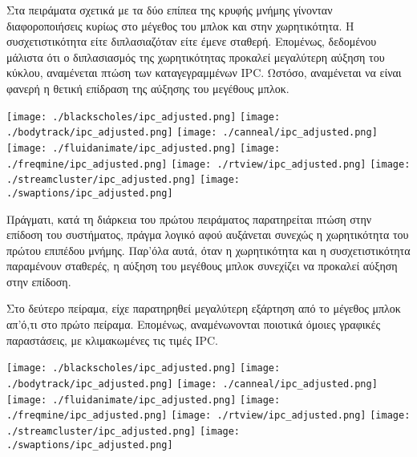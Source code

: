 \documentclass{article}
\newcommand{\eng}[1]{\foreignlanguage{english}{#1}}
\begin{document}
Στα πειράματα σχετικά με τα δύο επίπεα της κρυφής μνήμης γίνονταν διαφοροποιήσεις κυρίως στο μέγεθος του μπλοκ και στην χωρητικότητα. Η συσχετιστικότητα είτε διπλασιαζόταν είτε έμενε σταθερή. Επομένως, δεδομένου μάλιστα ότι ο διπλασιασμός της χωρητικότητας προκαλεί μεγαλύτερη αύξηση του κύκλου, αναμένεται πτώση των καταγεγραμμένων \eng{IPC}. Ωστόσο, αναμένεται να είναι φανερή η θετική επίδραση της αύξησης του μεγέθους μπλοκ.

\graphicspath{{../parsec-3.0/parsec_workspace/outputs/exp1/}}
\begin{center}
    \texttt{[image: ./blackscholes/ipc\_adjusted.png]} 
    \texttt{[image: ./bodytrack/ipc\_adjusted.png]} 
    \texttt{[image: ./canneal/ipc\_adjusted.png]} 
    \texttt{[image: ./fluidanimate/ipc\_adjusted.png]} 
    \texttt{[image: ./freqmine/ipc\_adjusted.png]} 
    \texttt{[image: ./rtview/ipc\_adjusted.png]} 
    \texttt{[image: ./streamcluster/ipc\_adjusted.png]} 
    \texttt{[image: ./swaptions/ipc\_adjusted.png]} 
\end{center}
\FloatBarrier

Πράγματι, κατά τη διάρκεια του πρώτου πειράματος παρατηρείται πτώση στην επίδοση του συστήματος, πράγμα λογικό αφού αυξάνεται συνεχώς η χωρητικότητα του πρώτου επιπέδου μνήμης. Παρ'όλα αυτά, όταν η χωρητικότητα και η συσχετιστικότητα παραμένουν σταθερές, η αύξηση του μεγέθους μπλοκ συνεχίζει να προκαλεί αύξηση στην επίδοση. 

Στο δεύτερο πείραμα, είχε παρατηρηθεί μεγαλύτερη εξάρτηση από το μέγεθος μπλοκ απ'ό,τι στο πρώτο πείραμα. Επομένως, αναμένωνονται ποιοτικά όμοιες γραφικές παραστάσεις, με κλιμακωμένες τις τιμές \eng{IPC}. 

\graphicspath{{../parsec-3.0/parsec_workspace/outputs/exp2/}}
\begin{center}
    \texttt{[image: ./blackscholes/ipc\_adjusted.png]} 
    \texttt{[image: ./bodytrack/ipc\_adjusted.png]} 
    \texttt{[image: ./canneal/ipc\_adjusted.png]} 
    \texttt{[image: ./fluidanimate/ipc\_adjusted.png]} 
    \texttt{[image: ./freqmine/ipc\_adjusted.png]} 
    \texttt{[image: ./rtview/ipc\_adjusted.png]} 
    \texttt{[image: ./streamcluster/ipc\_adjusted.png]} 
    \texttt{[image: ./swaptions/ipc\_adjusted.png]} 
\end{center}
\FloatBarrier
\end{document}
